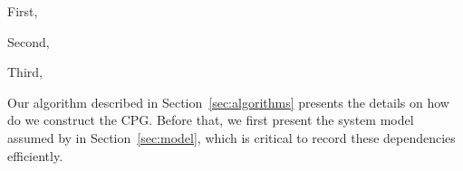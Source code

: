 First, 

Second,

Third,
 




%
%




Our algorithm described in Section~\ref{sec:algorithms} presents the details on how do we construct the CPG. Before that,  we first present the system model assumed by \projecttitle in Section~\ref{sec:model}, which is critical to record these dependencies efficiently.














 